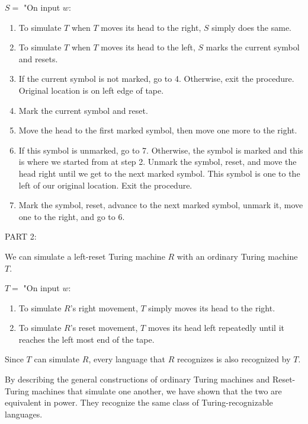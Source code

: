 \documentclass{article}
\begin{document}
\noindent $S = $ "On input $w$:
\begin{enumerate} [\indent 1.]

	\item To simulate $T$ when $T$ moves its head to the right, $S$ simply does the same.
	\item To simulate $T$ when $T$ moves its head to the left, $S$ marks the current symbol and resets.
	\item If the current symbol is not marked, go to 4. Otherwise, exit the procedure. Original location is on left edge of tape.
	\item Mark the current symbol and reset.
	\item Move the head to the first marked symbol, then move one more to the right.
	\item If this symbol is unmarked, go to 7. Otherwise, the symbol is marked and this is where we started from at step 2.
Unmark the symbol, reset, and move the head right until we get to the next marked symbol. This symbol is one to the left of our original location. Exit the procedure.
	\item Mark the symbol, reset, advance to the next marked symbol, unmark it, move one to the right, and go to 6.
\newline	
\end{enumerate}



\noindent PART 2:

\noindent We can simulate a left-reset Turing machine $R$ with an ordinary Turing machine $T$.\newline
  
  \noindent $T =$ "On input $w$:
  \begin{enumerate} [\indent 1.]
  
  	\item To simulate $R$'s right movement, $T$ simply moves its head to the right.
  	\item To simulate $R$'s reset movement, $T$ moves its head left repeatedly until it reaches the left most end of the tape. 
  	    \end{enumerate}
    
    \noindent Since $T$ can simulate $R$, every language that $R$ recognizes is also recognized by $T$.\newline
    
    \noindent By describing the general constructions of ordinary Turing machines and Reset-Turing machines that simulate one another, we have shown that the two are equivalent in power. They recognize the same class of Turing-recognizable languages.
\end{document}
